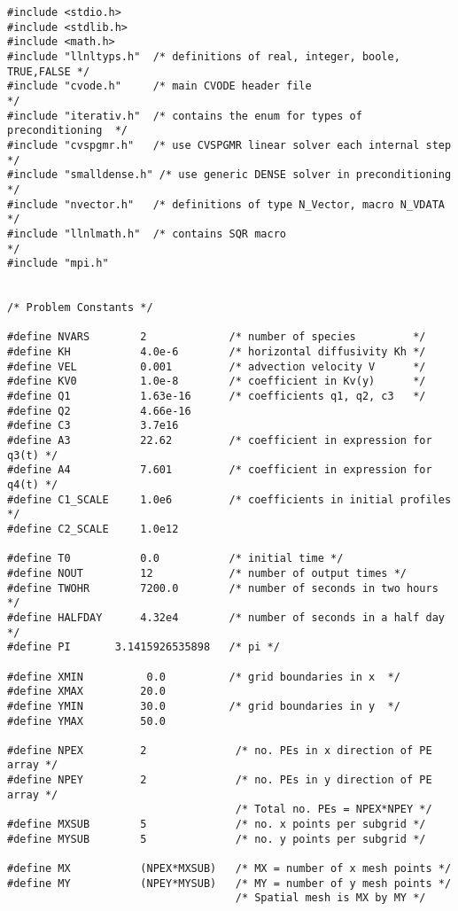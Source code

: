 \begin{verbatim}
#include <stdio.h>
#include <stdlib.h>
#include <math.h>
#include "llnltyps.h"  /* definitions of real, integer, boole, TRUE,FALSE */
#include "cvode.h"     /* main CVODE header file                          */
#include "iterativ.h"  /* contains the enum for types of preconditioning  */
#include "cvspgmr.h"   /* use CVSPGMR linear solver each internal step    */
#include "smalldense.h" /* use generic DENSE solver in preconditioning    */
#include "nvector.h"   /* definitions of type N_Vector, macro N_VDATA     */
#include "llnlmath.h"  /* contains SQR macro                              */
#include "mpi.h"


/* Problem Constants */

#define NVARS        2             /* number of species         */
#define KH           4.0e-6        /* horizontal diffusivity Kh */
#define VEL          0.001         /* advection velocity V      */
#define KV0          1.0e-8        /* coefficient in Kv(y)      */
#define Q1           1.63e-16      /* coefficients q1, q2, c3   */ 
#define Q2           4.66e-16
#define C3           3.7e16
#define A3           22.62         /* coefficient in expression for q3(t) */
#define A4           7.601         /* coefficient in expression for q4(t) */
#define C1_SCALE     1.0e6         /* coefficients in initial profiles    */
#define C2_SCALE     1.0e12

#define T0           0.0           /* initial time */
#define NOUT         12            /* number of output times */
#define TWOHR        7200.0        /* number of seconds in two hours  */
#define HALFDAY      4.32e4        /* number of seconds in a half day */
#define PI       3.1415926535898   /* pi */ 

#define XMIN          0.0          /* grid boundaries in x  */
#define XMAX         20.0           
#define YMIN         30.0          /* grid boundaries in y  */
#define YMAX         50.0

#define NPEX         2              /* no. PEs in x direction of PE array */
#define NPEY         2              /* no. PEs in y direction of PE array */
                                    /* Total no. PEs = NPEX*NPEY */
#define MXSUB        5              /* no. x points per subgrid */
#define MYSUB        5              /* no. y points per subgrid */

#define MX           (NPEX*MXSUB)   /* MX = number of x mesh points */
#define MY           (NPEY*MYSUB)   /* MY = number of y mesh points */
                                    /* Spatial mesh is MX by MY */


\end{verbatim}
